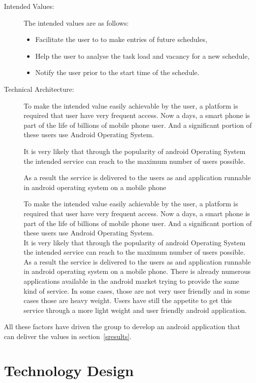 \documentclass[10pt,a4paper]{report}
\begin{document}
\begin{description}
 \item[Intended Values:] The intended values are as follows:
   \begin{itemize}
   		\item Facilitate the user to to make entries of future schedules,
   		\item Help the user to analyse the task load and vacancy for a new schedule,
   		\item Notify the user prior to the start time of the schedule.
   \end{itemize}    
 \item[Technical Architecture:] To make the intended value easily achievable by the user, a platform is required that user have very frequent access. Now a days, a smart phone is part of the life of billions of mobile phone user. And a significant portion of these users use Android Operating System.
 
It is very likely that through the popularity of android Operating System the intended service can reach to the maximum number of users possible.

As a result the service is delivered to the users as and application runnable in android operating system on a mobile phone

To make the intended value easily achievable by the user, a platform is required that user have very frequent access. Now a days, a smart phone is part of the life of billions of mobile phone user. And a significant portion of these users use Android Operating System. \\

It is very likely that through the popularity of android Operating System the intended service can reach to the maximum number of users possible. As a result the service is delivered to the users as and application runnable in android operating system on a mobile phone. There is already numerous applications available in the android market trying to provide the same kind of service. In some cases, those are not very user friendly and in some cases those are heavy weight. Users have still the appetite to get this service through a more light weight and user friendly android application.
\end{description}
All these factors have driven the group to develop an android application that can deliver the values in section~\ref{sresults}.



\section{Technology Design}
\end{document}
